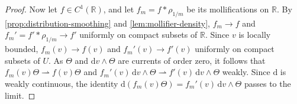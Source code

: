 \begin{proof}
Now let $f\in C^1(\mathbb R)$, and let $f_m=f*\rho_{1/m}$ be its mollifications on $\mathbb R$. By \cref{prop:distribution-smoothing} and \cref{lem:mollifier-density}, $f_m\to f$ and $f_m'=f'*\rho_{1/m}\to f'$ uniformly on compact subsets of $\mathbb R$. Since $v$ is locally bounded, $f_m(v)\to f(v)$ and $f_m'(v)\to f'(v)$ uniformly on compact subsets of $U$. As $\Theta$ and $\mathrm dv\wedge\Theta$ are currents of order zero, it follows that $f_m(v)\Theta\rightharpoonup f(v)\Theta$ and $f_m'(v)\,\mathrm dv\wedge\Theta\rightharpoonup f'(v)\,\mathrm dv\wedge\Theta$ weakly. Since $\mathrm d$ is weakly continuous, the identity $\mathrm d(f_m(v)\Theta)=f_m'(v)\,\mathrm dv\wedge\Theta$ passes to the limit.
\end{proof}

